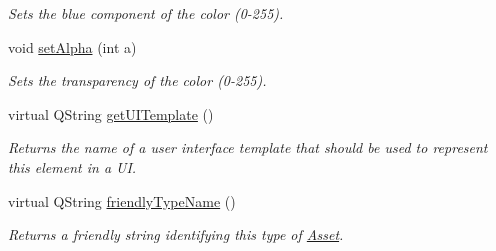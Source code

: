 \begin{DoxyCompactItemize}
\begin{DoxyCompactList}\small\item\em Sets the blue component of the color (0-\/255). \end{DoxyCompactList}\item 
\hypertarget{class_picto_1_1_color_parameter_a4cc34a6c44cb149768a44a5153872171}{void \hyperlink{class_picto_1_1_color_parameter_a4cc34a6c44cb149768a44a5153872171}{set\-Alpha} (int a)}\label{class_picto_1_1_color_parameter_a4cc34a6c44cb149768a44a5153872171}

\begin{DoxyCompactList}\small\item\em Sets the transparency of the color (0-\/255). \end{DoxyCompactList}\item 
\hypertarget{class_picto_1_1_color_parameter_a1e1dec09a540fd44487c32aa178f4a46}{virtual Q\-String \hyperlink{class_picto_1_1_color_parameter_a1e1dec09a540fd44487c32aa178f4a46}{get\-U\-I\-Template} ()}\label{class_picto_1_1_color_parameter_a1e1dec09a540fd44487c32aa178f4a46}

\begin{DoxyCompactList}\small\item\em Returns the name of a user interface template that should be used to represent this element in a U\-I. \end{DoxyCompactList}\item 
virtual Q\-String \hyperlink{class_picto_1_1_color_parameter_a6b76ec438bbaa6b46af6aa1ca9c9bd9c}{friendly\-Type\-Name} ()
\begin{DoxyCompactList}\small\item\em Returns a friendly string identifying this type of \hyperlink{class_picto_1_1_asset}{Asset}. \end{DoxyCompactList}\end{DoxyCompactItemize}
